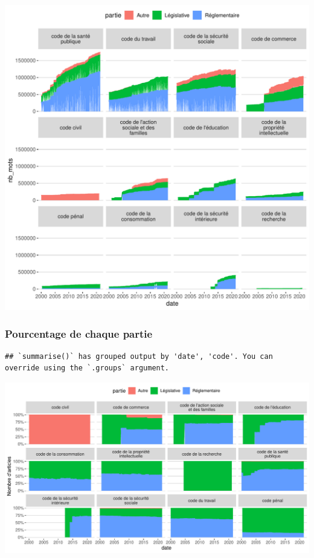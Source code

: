 \documentclass[
  oneside]{book}
\begin{document}
\includegraphics{05-images_files/figure-latex/lr.all.stack-1.pdf}

\hypertarget{pourcentage-de-chaque-partie}{%
\subsubsection{Pourcentage de chaque partie}\label{pourcentage-de-chaque-partie}}

\begin{verbatim}
## `summarise()` has grouped output by 'date', 'code'. You can override using the `.groups` argument.
\end{verbatim}

\includegraphics{05-images_files/figure-latex/lr.all.fill-1.pdf}
\end{document}
